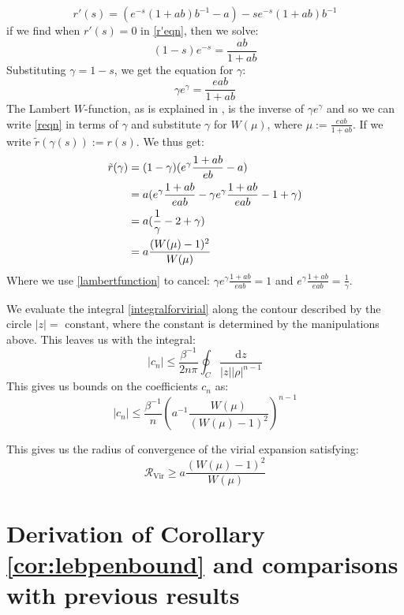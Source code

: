 \documentclass[reqno]{amsart}
\def\be{\begin{equation}}
\def\ee{\end{equation}}
\numberwithin{equation}{section}
\begin{document}
\be r'(s) = (e^{-s}(1+ab)b^{-1}-a)-se^{-s}(1+ab)b^{-1} \label{r'eqn} \ee
if we find when $r'(s)=0$ in \eqref{r'eqn}, then we solve:
\be (1-s)e^{-s}=\frac{ab}{1+ab} \ee
Substituting $\gamma=1-s$, we get the equation for $\gamma$:
\be \gamma e^{\gamma}=\frac{eab}{1+ab} \label{lambertfunction} \ee
The Lambert $W$-function, as is explained in \cite{CJK97}, is the inverse of $\gamma e^{\gamma}$ and so we can write \eqref{reqn} in terms of $\gamma$ and substitute $\gamma$ for $W(\mu)$, where $\mu := \frac{eab}{1+ab}$. If we write $\tilde{r}(\gamma(s)):=r(s)$. We thus get:
\begin{align} \tilde{r}(\gamma)&=(1-\gamma)(e^{\gamma}\frac{1+ab}{eb}-a) \notag \\
 &= a(e^{\gamma}\frac{1+ab}{eab}-\gamma e^{\gamma} \frac{1+ab}{eab}-1+\gamma) \notag \\
 &=a(\frac{1}{\gamma}-2+\gamma) \notag \\
 &=a\frac{(W(\mu)-1)^2}{W(\mu)} \label{finalreqn}
\end{align}
Where we use \eqref{lambertfunction} to cancel: $\gamma e^{\gamma} \frac{1+ab}{eab}=1$ and $e^{\gamma} \frac{1+ab}{eab}=\frac{1}{\gamma}$.

We evaluate the integral \eqref{integralforvirial} along the contour described by the circle $|z|=$ constant, where the constant is determined by the manipulations above. This leaves us with the integral: %
\be |c_n| \leq \frac{\beta^{-1}}{2n\pi} \oint_C \frac{\mathrm{d}z}{|z||\rho|^{n-1}} \ee
This gives us bounds on the coefficients $c_n$ as:
\be |c_n| \leq \frac{\beta^{-1}}{n} \left(a^{-1}\frac{W(\mu)}{(W(\mu)-1)^2}\right)^{n-1} \label{cbounds} \ee

This gives us the radius of convergence of the virial expansion satisfying:
\be \mathcal{R}_{\text{Vir}} \geq a \frac{(W(\mu)-1)^2}{W(\mu)} \ee
\section{Derivation of Corollary \ref{cor:lebpenbound} and comparisons with previous results}
\label{sec: oldbounds}
\end{document}
